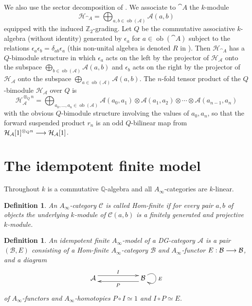 \documentclass[english,letter paper,12pt,leqno]{article}
\theoremstyle{example}
\newtheorem{definition}[theorem]{Definition}
\numberwithin{equation}{section}
\def\AA{\mathcal{A}}
\def\BB{\mathcal{B}}
\def\HH{\HH}
\def\HH{\mathcal{H}}
\def\be{\begin{equation}}
\def\ee{\end{equation}}
\def\nZ{\mathds{Z}}
\begin{document}
We also use the sector decomposition of \cite[\S 2.2]{lazaroiu}. We associate to $\cat{A}$ the $k$-module
\[
\HH_{\cat{A}} = \bigoplus_{a,b \in \operatorname{ob}(\AA)} \AA(a,b)
\]
equipped with the induced $\nZ_2$-grading. Let $Q$ be the commutative associative $k$-algebra (without identity) generated by $\epsilon_a$ for $a \in \operatorname{ob}(\cat{A})$ subject to the relations $\epsilon_a \epsilon_b = \delta_{ab} \epsilon_a$ (this non-unital algebra is denoted $R$ in \cite{lazaroiu}). Then $\HH_{\cat{A}}$ has a $Q$-bimodule structure in which $\epsilon_a$ acts on the left by the projector of $\HH_{\AA}$ onto the subspace $\bigoplus_{b \in \operatorname{ob}(\AA)} \AA(a,b)$ and $\epsilon_b$ acts on the right by the projector of $\HH_{\AA}$ onto the subspace $\bigoplus_{a \in \operatorname{ob}(\AA)} \AA(a,b)$. The $n$-fold tensor product of the $Q$-bimodule $\HH_{\AA}$ over $Q$ is
\be\label{eq:bimodule_tensor_hh}
\HH_{\AA}^{\otimes_Q n} = \bigoplus_{a_0,\ldots,a_n \in \operatorname{ob}(\AA)} \AA(a_0,a_1) \otimes \AA(a_1,a_2) \otimes \cdots \otimes \AA(a_{n-1},a_n)
\ee
with the obvious $Q$-bimodule structure involving the values of $a_0, a_n$, so that the forward suspended product $r_n$ is an odd $Q$-bilinear map from $\HH_{\AA}[1]^{\otimes_Q n} \lto \HH_{\AA}[1]$.

\section{The idempotent finite model}\label{section:the_model}

Throughout $k$ is a commutative $\mathbb{Q}$-algebra and all $A_\infty$-categories are $k$-linear.

\begin{definition} An $A_\infty$-category $\mathcal{C}$ is called \emph{Hom-finite} if for every pair $a,b$ of objects the underlying $k$-module of $\mathcal{C}(a,b)$ is a finitely generated and projective $k$-module.
\end{definition}

\begin{definition} An \emph{idempotent finite $A_\infty$-model} of a DG-category $\AA$ is a pair $(\BB, E)$ consisting of a Hom-finite $A_\infty$-category $\BB$ and $A_\infty$-functor $E: \BB \lto \BB$, and a diagram
\[
\xymatrix@C+3pc{
\AA \ar@<1ex>[r]^I & \BB \ar@(ur,dr)^E \ar@<1ex>[l]^P
}
\]
of $A_\infty$-functors and $A_\infty$-homotopies $P \circ I \simeq 1$ and $I \circ P \simeq E$. %
\end{definition}
\end{document}
